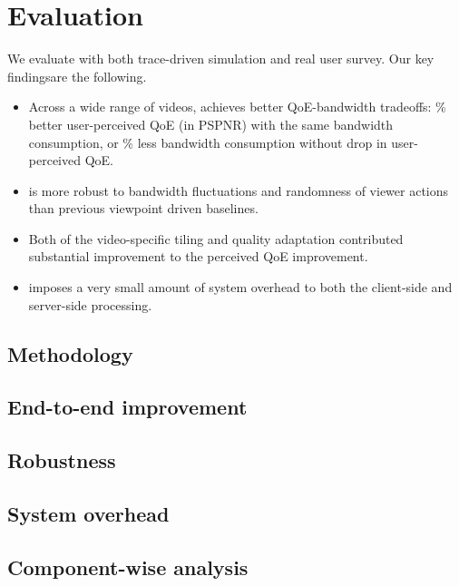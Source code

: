 
\section{Evaluation}

We evaluate \name with both trace-driven simulation and real user survey. 
Our key findingsare the following.

\begin{itemize}

\item Across a wide range of videos, \name achieves better QoE-bandwidth tradeoffs: \fillme\% better user-perceived QoE (in PSPNR) with the same bandwidth consumption, or \fillme\% less bandwidth consumption without drop in user-perceived QoE.

\item \name is more robust to bandwidth fluctuations and randomness of viewer actions than previous viewpoint driven baselines.

\item Both of the \vr video-specific tiling and quality adaptation contributed substantial improvement to the perceived QoE improvement.

\item \name imposes a very small amount of system overhead to both the client-side and server-side processing.

\end{itemize}

\subsection{Methodology}





\subsection{End-to-end improvement}




\subsection{Robustness}




\subsection{System overhead}




\subsection{Component-wise analysis}


